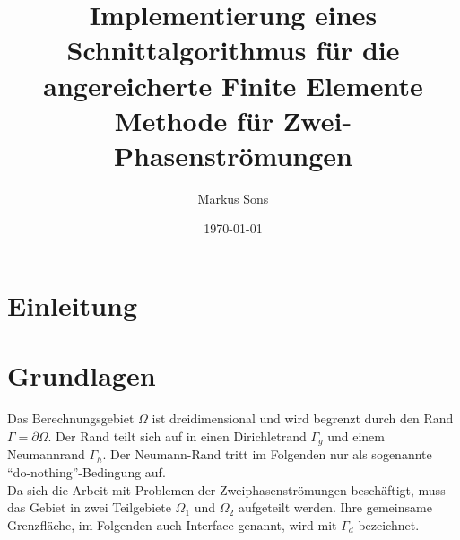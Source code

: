 





\author{Markus Sons}

\title{Implementierung eines Schnittalgorithmus für die angereicherte Finite
Elemente Methode für Zwei-Phasenströmungen}
\date{\today}

\maketitle

\tableofcontents
\listoffigures


\pagestyle{fancy}
\fancyhead{}  \fancyfoot{}
\renewcommand{\chaptermark}[1]{\markboth{#1}{}}
\renewcommand{\sectionmark}[1]{\markright{\thesection\space\space #1}}
\fancyhf{}
\fancyhead[RO]{\thepage}
\fancyhead[LO]{\rm \rightmark}
\fancyfoot[C]{\thepage}

\newpage



\chapter{Einleitung}

\chapter{Grundlagen}
Das Berechnungsgebiet $\Omega$ ist dreidimensional und wird begrenzt durch den Rand $\Gamma = \partial\Omega$. Der Rand teilt sich auf in einen Dirichletrand $\Gamma_g$ und einem Neumannrand $\Gamma_h$. Der Neumann-Rand tritt im Folgenden nur als sogenannte ``do-nothing''-Bedingung auf.\\

Da sich die Arbeit mit Problemen der Zweiphasenströmungen beschäftigt, muss das Gebiet in zwei Teilgebiete $\Omega_1$ und $\Omega_2$ aufgeteilt werden. Ihre gemeinsame Grenzfläche, im Folgenden auch Interface genannt, wird mit $\Gamma_d$ bezeichnet.\\

